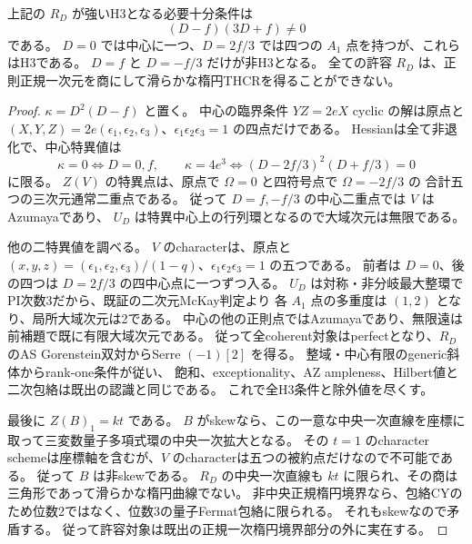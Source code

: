 \begin{theorem}[三角境界pencilの全H3切断]
\label{thm:quantum-triangle-all-cuts}
上記の $R_D$ が強いH3となる必要十分条件は
\[
 (D-f)(3D+f)\ne0
\]
である。
$D=0$ では中心に一つ、$D=2f/3$ では四つの $A_1$ 点を持つが、これらはH3である。
$D=f$ と $D=-f/3$ だけが非H3となる。
全ての許容 $R_D$ は、正則正規一次元を商にして滑らかな楕円THCRを得ることができない。
\end{theorem}
\begin{proof}
$\kappa=D^2(D-f)$ と置く。
中心の臨界条件 $YZ=2eX$ cyclic の解は原点と
$(X,Y,Z)=2e(\epsilon_1,\epsilon_2,\epsilon_3)$、$\epsilon_1\epsilon_2\epsilon_3=1$ の四点だけである。
Hessianは全て非退化で、中心特異値は
\[
 \kappa=0\iff D=0,f,\qquad
 \kappa=4e^3\iff (D-2f/3)^2(D+f/3)=0
\]
に限る。
$Z(V)$ の特異点は、原点で $\Omega=0$ と四符号点で $\Omega=-2f/3$ の
合計五つの三次元通常二重点である。
従って $D=f,-f/3$ の中心二重点では $V$ はAzumayaであり、
$U_D$ は特異中心上の行列環となるので大域次元は無限である。

他の二特異値を調べる。
$V$ のcharacterは、原点と
$(x,y,z)=(\epsilon_1,\epsilon_2,\epsilon_3)/(1-q)$、$\epsilon_1\epsilon_2\epsilon_3=1$ の五つである。
前者は $D=0$、後の四つは $D=2f/3$ の四中心点に一つずつ入る。
$U_D$ は対称・非分岐最大整環でPI次数3だから、既証の二次元McKay判定より
各 $A_1$ 点の多重度は $(1,2)$ となり、局所大域次元は2である。
中心の他の正則点ではAzumayaであり、無限遠は前補題で既に有限大域次元である。
従って全coherent対象はperfectとなり、$R_D$ のAS Gorenstein双対からSerre $(-1)[2]$ を得る。
整域・中心有限のgeneric斜体からrank-one条件が従い、
飽和、exceptionality、AZ ampleness、Hilbert値と二次包絡は既出の認識と同じである。
これで全H3条件と除外値を尽くす。

最後に $Z(B)_1=kt$ である。
$B$ がskewなら、この一意な中央一次直線を座標に取って三変数量子多項式環の中央一次拡大となる。
その $t=1$ のcharacter schemeは座標軸を含むが、$V$ のcharacterは五つの被約点だけなので不可能である。
従って $B$ は非skewである。
$R_D$ の中央一次直線も $kt$ に限られ、その商は三角形であって滑らかな楕円曲線でない。
非中央正規楕円境界なら、包絡CYのため位数2ではなく、位数3の量子Fermat包絡に限られる。
それもskewなので矛盾する。
従って許容対象は既出の正規一次楕円境界部分の外に実在する。
\end{proof}

